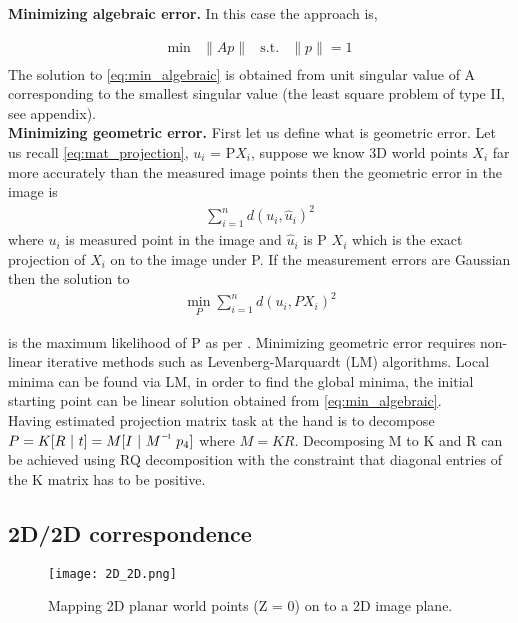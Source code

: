 \textbf{Minimizing algebraic error.} In this case the approach is,   

\begin{equation}
\begin{matrix}
\displaystyle \min & \|Ap\| & \textrm{s.t.} & \|p\| = 1\\
\end{matrix}
\label{eq:min_algebraic}
\end{equation}
The solution to \cref{eq:min_algebraic} is obtained from unit singular value of A corresponding to the smallest singular value (the least square problem of type II, see appendix).\\

\textbf{Minimizing geometric error.} First let us define what is geometric error. Let us recall \cref{eq:mat_projection}, \textbf{$u_i$} = P\textbf{$X_i$}, suppose we know 3D world points \textbf{$X_i$} far more accurately than the measured image points then the geometric error in the image is 
\begin{equation*}
\begin{matrix}
\displaystyle \sum_{i=1}^{n} d (u_i, \hat{u}_i)^2 
\end{matrix}
\end{equation*}
where $u_i$ is measured point in the image and $\hat{u}_i$ is P \textbf{$X_i$} which is the exact projection of \textbf{$X_i$} on to the image under P. If the measurement errors are Gaussian then the solution to 
\begin{equation}
\begin{matrix}
\displaystyle \min_{P} \sum_{i=1}^{n} d (u_i, P\textbf{$X_i$})^2 
\end{matrix}
\label{eq:min_geometric}
\end{equation}

is the maximum likelihood of P  as per \cite{Hartley:2003:MVG:861369}. Minimizing geometric error requires non-linear iterative methods such as Levenberg-Marquardt (LM) algorithms. Local minima can be found via LM, in order to find the global minima, the initial starting point can be linear solution obtained from \cref{eq:min_algebraic}.\\

Having estimated projection matrix task at the hand is to decompose $P = K[R\ |\ t] = M[I\ |\ \inv{M}\ {p_4}]$ where $M = KR$. Decomposing M to K and R can be achieved using RQ decomposition with the constraint that diagonal entries of the K matrix has to be positive.

\subsection{2D/2D correspondence}
\begin{figure}[hbt!]
	\centering
	\texttt{[image: 2D\_2D.png]}
	\caption{Mapping 2D planar world points (Z = 0) on to a 2D image plane.}
	\label{fig:2D_3D}
\end{figure}

